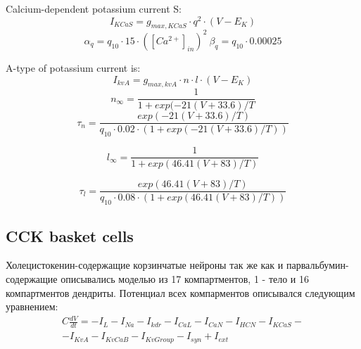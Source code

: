 \documentclass[12pt]{article}
\begin{document}
Calcium-dependent potassium current S:
\begin{equation}
\label{eq:KvCaS}
I_{KCaS} = g_{max, KCaS} \cdot q^2 \cdot (V - E_K)
\end{equation}
\begin{equation}
\alpha_q = q_{10} \cdot 15 \cdot ([Ca^{2+}]_{in})^2 \  \beta_q = q_{10} \cdot 0.00025
\end{equation}

A-type of potassium current is:
\begin{equation}
\label{eq:KvA}
I_{kvA} = g_{max, kvA} \cdot n \cdot l \cdot (V - E_K)
\end{equation}
\begin{equation}
n_{\infty} = \frac{1}{1 + exp(-21(V + 33.6)/T}
\end{equation}
\begin{equation}
\tau_n = \frac{exp(-21(V + 33.6)/T) }
{q_{10} \cdot 0.02 \cdot (1 + exp(-21(V + 33.6)/T))}
\end{equation}

\begin{equation}
l_{\infty} = \frac{1}{1 + exp(46.41(V + 83)/T)}
\end{equation}

\begin{equation}
\tau_l = \frac{exp(46.41(V + 83)/T) }
{q_{10} \cdot 0.08 \cdot (1 + exp(46.41(V + 83)/T))}
\end{equation}

\subsection{CCK basket cells}
Холецистокенин-содержащие корзинчатые нейроны так же как и парвальбумин-содержащие описывались моделью из 17 компартментов, 1 - тело и 16 компартментов дендриты. Потенциал всех компарментов описывался следующим уравнением:
\begin{eqnarray}
C\frac{dV}{dt}=-I_L-I_{Na}-I_{kdr}-I_{CaL}-I_{CaN}-I_{HCN}-I_{KCaS}- \nonumber \\
-I_{KvA}-I_{KvCaB}-I_{KvGroup}-I_{syn} + I_{ext}
\end{eqnarray}
\end{document}
